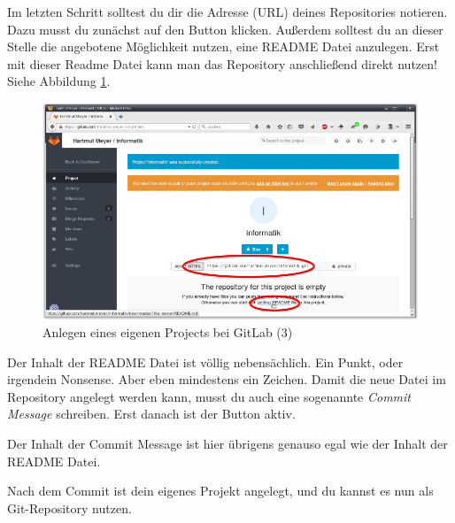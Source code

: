 Im letzten Schritt solltest du dir die Adresse (URL) deines Repositories
notieren. Dazu musst du zunächst auf den Button  klicken. Außerdem
solltest du an dieser Stelle die angebotene Möglichkeit nutzen, eine README
Datei anzulegen. Erst mit dieser Readme Datei kann man das Repository
anschließend direkt nutzen! Siehe Abbildung \ref{fig:gitlab-new-project-3}.

\begin{figure}[h]
  \centering
   \includegraphics[width=1.0\textwidth]{./inf/SEKII/01_Vorbereitung/GitLab_New_Project_3.png}
   \caption{Anlegen eines eigenen Projects bei GitLab (3)}
   \label{fig:gitlab-new-project-3}
\end{figure}

Der Inhalt der README Datei ist völlig nebensächlich. Ein Punkt, oder irgendein
Nonsense. Aber eben mindestens ein Zeichen. Damit die neue Datei im
Repository angelegt werden kann, musst du auch eine sogenannte \emph{Commit
Message} schreiben. Erst danach ist der Button  aktiv.

Der Inhalt der Commit Message ist hier übrigens genauso egal wie der Inhalt der
README Datei.

Nach dem Commit ist dein eigenes Projekt angelegt, und du kannst es nun als
Git-Repository nutzen.





